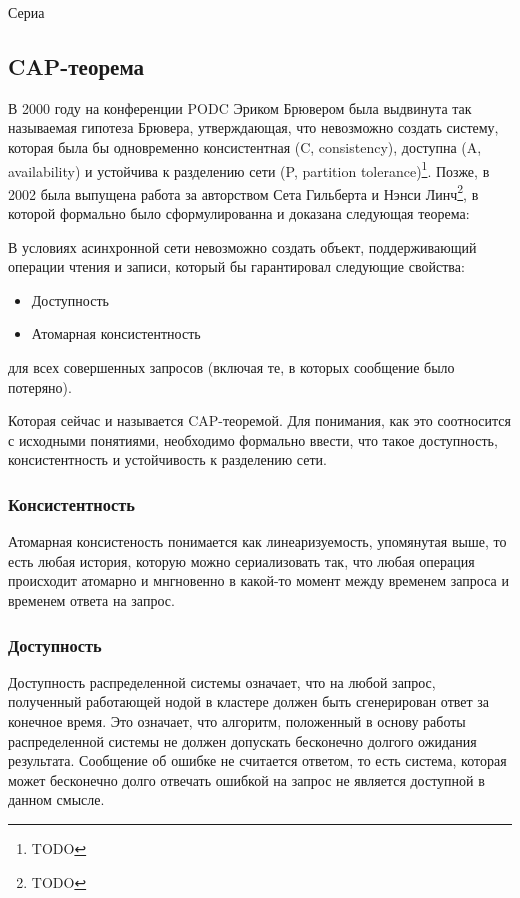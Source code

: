 Сериа

\subsection{CAP-теорема}

В 2000 году на конференции PODC Эриком Брювером была выдвинута так называемая гипотеза Брювера, утверждающая, что невозможно создать систему, которая была бы одновременно консистентная (C, consistency), доступна (A, availability) и устойчива к разделению сети (P, partition tolerance)\footnote{TODO}. Позже, в 2002 была выпущена работа за авторством Сета Гильберта и Нэнси Линч\footnote{TODO}, в которой формально было сформулированна и доказана следующая теорема:

\begin{theorem}
	В условиях асинхронной сети невозможно создать объект, поддерживающий операции чтения и записи, который бы гарантировал следующие свойства:
	
	\begin{itemize}
		\item Доступность
		\item Атомарная консистентность
	\end{itemize}
	
	для всех совершенных запросов (включая те, в которых сообщение было потеряно).
\end{theorem}

Которая сейчас и называется CAP-теоремой. Для понимания, как это соотносится с исходными понятиями, необходимо формально ввести, что такое доступность, консистентность и устойчивость к разделению сети.

\subsubsection{Консистентность}

Атомарная консистеность понимается как линеаризуемость, упомянутая выше, то есть любая история, которую можно сериализовать так, что любая операция происходит атомарно и мнгновенно в какой-то момент между временем запроса и временем ответа на запрос.

\subsubsection{Доступность}

Доступность распределенной системы означает, что на любой запрос, полученный работающей нодой в кластере должен быть сгенерирован ответ за конечное время. Это означает, что алгоритм, положенный в основу работы распределенной системы не должен допускать бесконечно долгого ожидания результата. Сообщение об ошибке не считается ответом, то есть система, которая может бесконечно долго отвечать ошибкой на запрос не является доступной в данном смысле.

